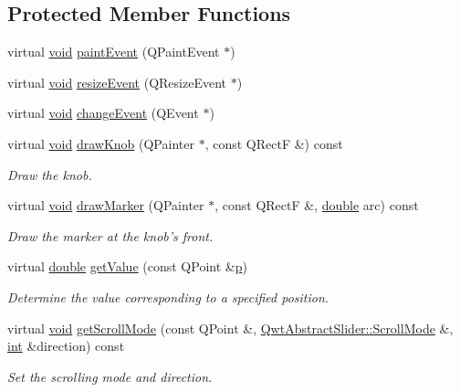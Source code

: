 \subsection*{Protected Member Functions}
\begin{DoxyCompactItemize}
\item 
virtual \hyperlink{group___u_a_v_objects_plugin_ga444cf2ff3f0ecbe028adce838d373f5c}{void} \hyperlink{class_qwt_knob_aac9eb31c18408aaa224f5ad040631384}{paint\-Event} (Q\-Paint\-Event $\ast$)
\item 
virtual \hyperlink{group___u_a_v_objects_plugin_ga444cf2ff3f0ecbe028adce838d373f5c}{void} \hyperlink{class_qwt_knob_abf47fbc76e68791d3012499198285662}{resize\-Event} (Q\-Resize\-Event $\ast$)
\item 
virtual \hyperlink{group___u_a_v_objects_plugin_ga444cf2ff3f0ecbe028adce838d373f5c}{void} \hyperlink{class_qwt_knob_abccdba2f96c353ecc004adfcb19d2db9}{change\-Event} (Q\-Event $\ast$)
\item 
virtual \hyperlink{group___u_a_v_objects_plugin_ga444cf2ff3f0ecbe028adce838d373f5c}{void} \hyperlink{class_qwt_knob_a5ebc1ef5761b8db6d67820fc14cb89d5}{draw\-Knob} (Q\-Painter $\ast$, const Q\-Rect\-F \&) const 
\begin{DoxyCompactList}\small\item\em Draw the knob. \end{DoxyCompactList}\item 
virtual \hyperlink{group___u_a_v_objects_plugin_ga444cf2ff3f0ecbe028adce838d373f5c}{void} \hyperlink{class_qwt_knob_a2b0523757918e335fe444df702972f3e}{draw\-Marker} (Q\-Painter $\ast$, const Q\-Rect\-F \&, \hyperlink{_super_l_u_support_8h_a8956b2b9f49bf918deed98379d159ca7}{double} arc) const 
\begin{DoxyCompactList}\small\item\em Draw the marker at the knob's front. \end{DoxyCompactList}\item 
virtual \hyperlink{_super_l_u_support_8h_a8956b2b9f49bf918deed98379d159ca7}{double} \hyperlink{class_qwt_knob_a8bc3dd547ed410548b451f074f633546}{get\-Value} (const Q\-Point \&\hyperlink{glext_8h_aa5367c14d90f462230c2611b81b41d23}{p})
\begin{DoxyCompactList}\small\item\em Determine the value corresponding to a specified position. \end{DoxyCompactList}\item 
virtual \hyperlink{group___u_a_v_objects_plugin_ga444cf2ff3f0ecbe028adce838d373f5c}{void} \hyperlink{class_qwt_knob_a42e3a55eb22c249311e5cacefb22ae71}{get\-Scroll\-Mode} (const Q\-Point \&, \hyperlink{class_qwt_abstract_slider_ae4c0c4844ac6a35356f3c529a8eae154}{Qwt\-Abstract\-Slider\-::\-Scroll\-Mode} \&, \hyperlink{ioapi_8h_a787fa3cf048117ba7123753c1e74fcd6}{int} \&direction) const 
\begin{DoxyCompactList}\small\item\em Set the scrolling mode and direction. \end{DoxyCompactList}\end{DoxyCompactItemize}
